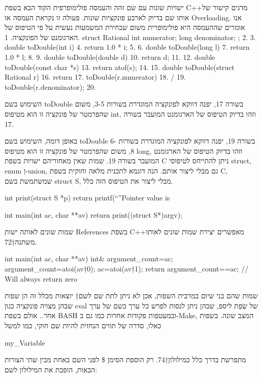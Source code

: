       ישויות שונות עם שם זהה והעמסה פולימופרפית
      הקוד הבא בשפת C++מדגים קישור של אותו שם בדיוק לארבע פונקציות שונות. פעולה זו נקראת העמסה או Overloading. אנו אומרים שההעמסה היא פולימופרית משום שבחירת המשמעות נעשית על פי הטיפוס של הארגומנט של הפונקציה.
      1. struct Rational { int numerator; long denominator; };
      2. 3. double toDouble(int i) {
        4. return 1.0 * i;
      5. }
      6. double toDouble(long l) {
        7. return 1.0 * l;
      8. }
      9. double toDouble(double d) {
        10. return d;
      11. }
      12. double toDouble(const char *s) {
        13. return atof(s);
      14. }
      15. double toDouble(struct Rational r) {
        16. return
        17. toDouble(r.numerator)
        18. /
        19. toDouble(r.denominator);
      20. }
      \begin{ציינון}
\item השימוש בשם toDouble בשורה 17, יפנה דווקא לפונקציה המוגדרת בשורות 3-5, משום שהפרמטר של פונקציה זו הוא מטיפוס int, וזהו בדיוק הטיפוס של הארגומנט המועבר בשורה 17.
\item באופן דומה, השימוש בשם toDouble בשורה 19, יפנה דווקא לפונקציה המוגדרת בשורות 6-8, משום שהפרמטר של פונקציה זו הוא מטיפוס long, וזהו בדיוק הטיפוס של הארגומנט המועבר בשורה 19.
      שמות שאין מאחוריהם ישויות
      בשפת C ניתן להתייחס לטיפוסי struct, enum וְ-union, גם מבלי ליצור אותם. הנה דוגמא לתכנית מלאה וחוקית בשפת C, שמשתמשת בשם struct S, מבלי ליצור את הטיפוס הזה כלל.
  \end{ציינון}

      int print(struct S *p) {
        return printf(“”Pointer value is %
      }

      int main(int ac, char **av) {
        return print((struct S*)argv);
      }

      שמות שונים לאותה ישות
      References בשפת C++מאפשרים יצירת שמות שונים לאותו משתנה†{72}.
\begin{CPP}
int main(int ac, char **av) {
 int& argument_count=ac;
  argument_count=atoi(av†{0});
 ac=atoi(av†{1});
 return argument_count==ac; // Will always return zero
}
\end{CPP}

      שמות שהם בני שיום
      במרבית השפות, אכן לא ניתן לתת שם לשם†{ יוצאות מכלל זה הן שפות שבהן מצויה פונקציה כגון eval של שְׂפַת ליספ, שבהן ניתן לנסות לפרש כל ערך כשם של ערך אחר.}. אולם בשפת BASH ובמעטפות פקודות אחרות כמו גם ב-Make, המצב שונה. בשפות כאלו, סדרה של תווים הנחזית להיות שם חוקי, כמו למשל
\begin{CPP}
my_Variable
\end{CPP}
      \begin{ציינון}
\item מתפרשת בדרך כלל כמילולון†{74}. רק הוספת הסימן \$ לפני השם באחת מבין שתי הצורות הבאות, הופכת את המילולון לשם:
    \end{ציינון}

